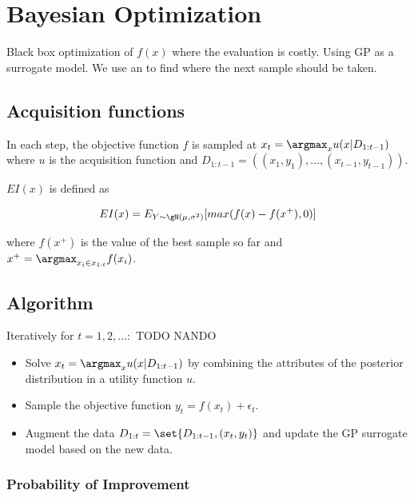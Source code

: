 \chapter{Bayesian Optimization}

Black box optimization of $f(x)$ where the evaluation is costly. Using GP as a
surrogate model. We use an  to find where the
next sample should be taken.

\section{Acquisition functions}

In each step, the objective function $f$ is sampled at $x_t = \argmax_x
u(x|D_{1:t-1})$ where $u$ is the acquisition function and $D_{1:t-1} =
((x_1,y_1),\ldots,(x_{t-1},y_{t-1}))$.

\begin{defn}
   $EI(x)$ is defined as

  \begin{equation}
    EI(x) = E_{Y \sim \gN(\mu, \sigma^2)} [max(f(x) - f(x^+), 0)]
  \end{equation}

  where $f(x^+)$ is the value of the best sample so far and $x^+ =
  \argmax_{x_i \in x_{1:t}} f(x_i)$.
\end{defn}

\section{Algorithm}

Iteratively for $t = 1,2,\ldots:$ {TODO NANDO}

\begin{itemize}
  \item Solve $x_t = \argmax_x u(x|D_{1:t-1})$ by combining the attributes of
    the posterior distribution in a utility function $u$.
  \item Sample the objective function $y_t = f(x_t) + \epsilon_t$.
  \item Augment the data $D_{1:t} = \set{D_{1:t-1}, (x_t, y_t)}$ and update
    the GP surrogate model based on the new data.
\end{itemize}


\subsection{Probability of Improvement}

